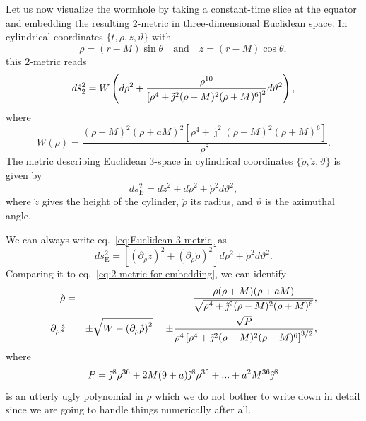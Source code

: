 \documentclass[aps,preprint,groupedaddress,nofootinbib,superscriptaddress,showkeys,showpacs,eqsecnum,amsmath,amssymb]{revtex4-1}
\begin{document}
Let us now visualize the wormhole by taking a constant-time slice at the equator and embedding the resulting 2-metric in three-dimensional Euclidean space. In cylindrical coordinates $\{t,\rho,z,\vartheta\}$ with
\begin{equation}
    \rho=(r-M)\sin\theta\quad \text{and}\quad z=(r-M)\cos\theta,\label{eq:CYcoords}
\end{equation}
this 2-metric reads 
\begin{equation}
    d\hat{s}^2_2 = W\left( d\rho^2 + \frac{\rho^{10}}{\left[ \rho^4 + \Tilde{\jmath}^2(\rho-M)^2(\rho+M)^6 \right]^2}d\vartheta^2\right),\label{eq:2-metric for embedding}
\end{equation}
where 
\begin{equation}
    {W}(\rho) = \frac{(\rho+M)^2(\rho+a M)^2\left[ \rho^4 + \tilde{\jmath}^2(\rho-M)^2(\rho+M)^6 \right]}{\rho^8}.
\end{equation}
The metric describing Euclidean 3-space in cylindrical coordinates $\{\mathring{\rho},\mathring{z},\vartheta\}$ is given by
\begin{equation}
    ds^2_{\text{E}} = d \mathring{z}^2 + d\mathring{\rho}^2 + \mathring{\rho}^2d\vartheta^2,\label{eq:Euclidean 3-metric}
\end{equation}
where $\mathring{z}$ gives the height of the cylinder, $\mathring{\rho}$ its radius, and $\vartheta$ is the azimuthal angle. 

We can always write eq.~\eqref{eq:Euclidean 3-metric} as 
\begin{equation}
    ds^2_{\text{E}} = \left[ \left( \partial_\rho \mathring{z} \right)^2 + \left( \partial_\rho \mathring{\rho} \right)^2 \right] d\rho^2 + \mathring{\rho}^2 d\vartheta^2.
\end{equation}
Comparing it to eq.~\eqref{eq:2-metric for embedding}, we can identify 
\begin{eqnarray}
\mathring{\rho}&=&\frac{\rho(\rho+M)(\rho+a M)}{\sqrt{\rho^4 + \Tilde{\jmath}^2(\rho-M)^2(\rho+M)^6}},\\
\partial_\rho \mathring{z}&=&\pm \sqrt{W-\left( \partial_\rho \mathring{\rho} \right)^2}=\pm\frac{\sqrt{{P}}}{\rho^4\left[ \rho^4 + \tilde{\jmath}^2(\rho-M)^2(\rho+M)^6 \right]^{3/2}},\label{eq:ODE}
\end{eqnarray}
where 
\begin{equation}
    {P} = \Tilde{\jmath}^8\rho^{36}+2M(9+a)\Tilde{\jmath}^8\rho^{35}+...+a^2M^{36}\Tilde{\jmath}^8
\end{equation}
is an utterly ugly polynomial in $\rho$ which we do not bother to write down in detail since we are going to handle things numerically after all. 
\end{document}
